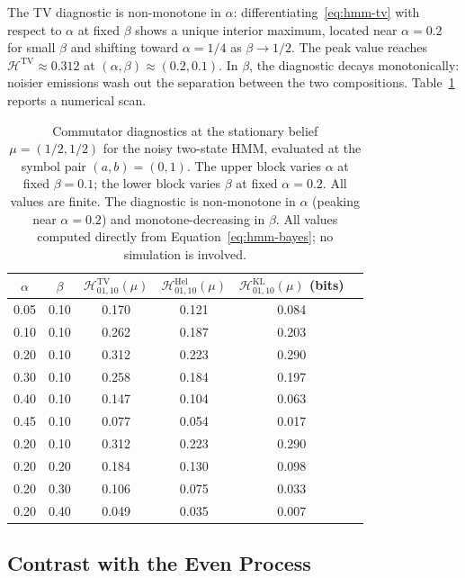 \documentclass[11pt,a4paper]{article}
\theoremstyle{plain}
\theoremstyle{definition}
\theoremstyle{remark}
\begin{document}
The TV diagnostic is non-monotone in $\alpha$: differentiating~\eqref{eq:hmm-tv} with respect to $\alpha$ at fixed $\beta$ shows a unique interior maximum, located near $\alpha = 0.2$ for small $\beta$ and shifting toward $\alpha = 1/4$ as $\beta \to 1/2$. The peak value reaches $\mathcal{H}^{\mathrm{TV}} \approx 0.312$ at $(\alpha, \beta) \approx (0.2, 0.1)$. In $\beta$, the diagnostic decays monotonically: noisier emissions wash out the separation between the two compositions. Table~\ref{tab:hmm-scan} reports a numerical scan.

\begin{table}[ht]
\centering
\begin{tabular}{cccccc}
\toprule
$\alpha$ & $\beta$ & $\mathcal{H}^{\mathrm{TV}}_{01,10}(\mu)$ & $\mathcal{H}^{\mathrm{Hel}}_{01,10}(\mu)$ & $\mathcal{H}^{\mathrm{KL}}_{01,10}(\mu)$ (bits) \\
\midrule
0.05 & 0.10 & 0.170 & 0.121 & 0.084 \\
0.10 & 0.10 & 0.262 & 0.187 & 0.203 \\
0.20 & 0.10 & 0.312 & 0.223 & 0.290 \\
0.30 & 0.10 & 0.258 & 0.184 & 0.197 \\
0.40 & 0.10 & 0.147 & 0.104 & 0.063 \\
0.45 & 0.10 & 0.077 & 0.054 & 0.017 \\
\midrule
0.20 & 0.10 & 0.312 & 0.223 & 0.290 \\
0.20 & 0.20 & 0.184 & 0.130 & 0.098 \\
0.20 & 0.30 & 0.106 & 0.075 & 0.033 \\
0.20 & 0.40 & 0.049 & 0.035 & 0.007 \\
\bottomrule
\end{tabular}
\caption{Commutator diagnostics at the stationary belief $\mu = (1/2, 1/2)$ for the noisy two-state HMM, evaluated at the symbol pair $(a, b) = (0, 1)$. The upper block varies $\alpha$ at fixed $\beta = 0.1$; the lower block varies $\beta$ at fixed $\alpha = 0.2$. All values are finite. The diagnostic is non-monotone in $\alpha$ (peaking near $\alpha = 0.2$) and monotone-decreasing in $\beta$. All values computed directly from Equation~\eqref{eq:hmm-bayes}; no simulation is involved.}
\label{tab:hmm-scan}
\end{table}

\subsection{Contrast with the Even Process}
\end{document}
